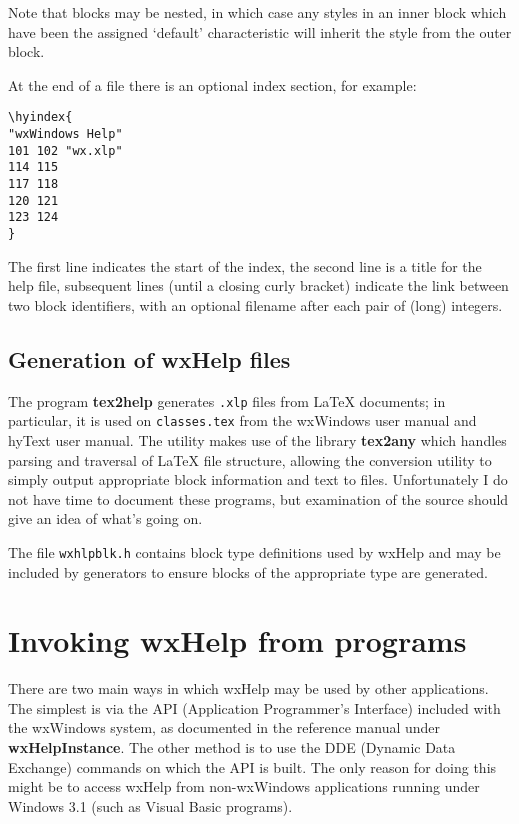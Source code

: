 Note that blocks may be nested, in which case any styles in an inner
block which have been the assigned `default' characteristic will
inherit the style from the outer block.

At the end of a file there is an optional index section, for example:

\begin{verbatim}
\hyindex{
"wxWindows Help"
101 102 "wx.xlp"
114 115
117 118
120 121
123 124
}
\end{verbatim}

The first line indicates the start of the index, the second line is
a title for the help file, subsequent lines (until a closing curly bracket)
indicate the link between two block identifiers, with an optional filename
after each pair of (long) integers.

\section{Generation of wxHelp files}

The program {\bf tex2help} generates {\tt .xlp} files from LaTeX
documents; in particular, it is used on {\tt classes.tex} from the
wxWindows user manual and hyText user manual. The utility makes use of
the library {\bf tex2any} which handles parsing and traversal of LaTeX
file structure, allowing the conversion utility to simply output
appropriate block information and text to files. Unfortunately I do
not have time to document these programs, but examination of the
source should give an idea of what's going on.

The file {\tt wxhlpblk.h} contains block type definitions used by
wxHelp and may be included by generators to ensure blocks of the
appropriate type are generated.

\chapter{Invoking wxHelp from programs}
%
\setfooter{\thepage}{}{}{}{}{\thepage}

There are two main ways in which wxHelp may be used by other
applications. The simplest is via the API (Application Programmer's
Interface) included with the wxWindows system, as documented in
the reference manual under {\bf wxHelpInstance}. The other method is
to use the DDE (Dynamic Data Exchange) commands on which the API is
built. The only reason for doing this might be to access wxHelp from
non-wxWindows applications running under Windows 3.1 (such as Visual
Basic programs).

